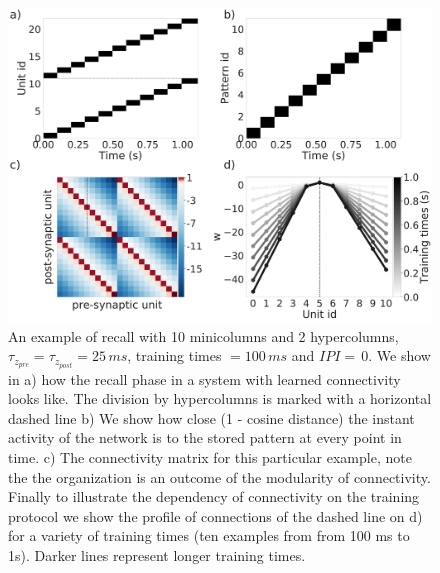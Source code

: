 \documentclass[10pt,a4paper]{article}
\begin{document}
\begin{figure}[H]
\centering
\includegraphics[scale=0.20]{recall_example.pdf}
\caption{An example of recall with 10 minicolumns and 2 hypercolumns, $\tau_{z_{pre}} = \tau_{z_{post}}=25 \, ms$, training times $=100 \, ms$ and $IPI = \, 0 $. We show in a) how the recall phase in a system with learned connectivity looks like. The division by hypercolumns is marked with a horizontal dashed line b) We show how close (1 - cosine distance) the instant activity of the network is to the stored pattern at every point in time. c) The connectivity matrix for this particular example, note the the organization is an outcome of the modularity of connectivity. Finally to illustrate the dependency of connectivity on the training protocol we show the profile of connections of the dashed line on d) for a variety of training times (ten examples from from 100 ms to 1s). Darker lines represent longer training times.}
\label{fig:recall_example}
\end{figure}
\end{document}
